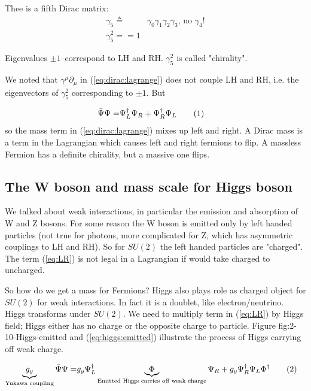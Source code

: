 \documentclass[]{article}
\newcommand\numberthis{\addtocounter{equation}{1}\tag{\theequation}}
\begin{document}
Thee is a fifth Dirac matrix:
\begin{align*}
	\gamma_5 \triangleq & \gamma_0 \gamma_1 \gamma_2 \gamma_3 \text{, no $\gamma_4$!}\\
	\gamma_5^2 ==1
\end{align*}

Eigenvalues $\pm 1$--correspond to LH and RH. $\gamma_5^2$ is called "chirality".

We noted that $\gamma^\mu \partial_\mu$ in (\ref{eq:dirac:lagrange}) does not couple LH and RH, i.e. the eigenvectors of $\gamma_5^2$ corresponding to $\pm 1$. But

\begin{align*}
	\bar{\Psi}\Psi =& \Psi^\dagger_L \Psi_R + \Psi^\dagger_R \Psi_L \numberthis \label{eq:LR}
\end{align*}
so the mass term in  (\ref{eq:dirac:lagrange}) mixes up left and right. A Dirac mass is a term in the Lagrangian which causes left and right fermions to flip. A massless Fermion has a definite chirality, but a massive one flips.

\subsection{The W boson and mass scale for Higgs boson}

We talked about weak interactions, in particular the emission and absorption of W and Z bosons. For some reason the W boson is emitted only by left handed particles (not true for photons, more complicated for Z, which has asymmetric couplings to LH and RH). So for $SU(2)$ the left handed particles are "charged". The term (\ref{eq:LR}) is not legal in a Lagrangian if would take charged to uncharged.

So how do we get a mass for Fermions? Higgs also plays role as charged object for $SU(2)$ for weak interactions. In fact it is a doublet, like electron/neutrino. Higgs transforms under $SU(2)$. We need to multiply term in (\ref{eq:LR}) by Higgs field; Higgs either has no charge or the opposite charge to particle. Figure fig:2-10-Higgs-emitted and (\ref{eq:higgs:emitted}) illustrate the process of Higgs carrying off weak charge.

\begin{align*}
	\underbrace{g_y}_\text{Yukawa coupling} \bar{\Psi}\Psi =& g_y \Psi^\dagger_L \underbrace{\Phi}_\text{Emitted Higgs carries off weak charge} \Psi_R + g_y \Psi^\dagger_R \Psi_L \Phi^\dagger \numberthis \label{eq:higgs:emitted}
\end{align*}
\end{document}
